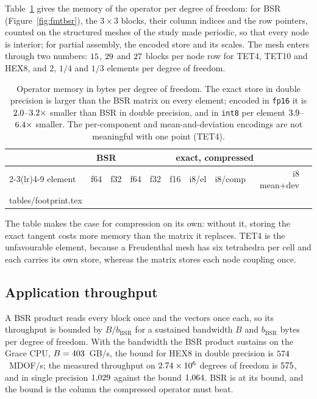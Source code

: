\documentclass[sigconf,balance=false]{acmart}
\makeatletter
\newcommand{\rows}[1]{\@@input #1 }
\makeatother
\begin{document}
Table~\ref{tab:footprint} gives the memory of the operator per degree of freedom: for BSR
(Figure~\ref{fig:fmtbsr}), the
$3\times3$ blocks, their column indices and the row pointers, counted on the structured meshes of
the study made periodic, so that every node is interior; for partial assembly, the encoded store and
its scales.  The mesh enters through two numbers: $15$, $29$ and
$27$ blocks per node row for TET4, TET10 and HEX8, and $2$, $1/4$ and $1/3$ elements
per degree of freedom.

\begin{table}[t]
\centering
\small
\begin{tabular}{lrrrrrrrrr}
\toprule
 & \multicolumn{2}{c}{BSR} & \multicolumn{6}{c}{exact, compressed} \\
\cmidrule(lr){2-3}\cmidrule(lr){4-9}
element & f64 & f32 & f64 & f32 & f16 & i8/el & i8/comp & i8 mean+dev \\
\midrule
\rows{tables/footprint.tex}
\bottomrule
\end{tabular}
\caption{Operator memory in bytes per degree of freedom.  The exact store in double precision is larger than the BSR matrix on every
element; encoded in \texttt{fp16} it is $2.0$--$3.2\times$ smaller than
BSR in double precision, and in \texttt{int8} per element $3.9$--$6.4\times$
smaller.  The per-component and mean-and-deviation encodings are not meaningful with one point
(TET4).}
\label{tab:footprint}
\end{table}

The table makes the case for compression on its own: without it, storing the exact tangent costs
more memory than the matrix it replaces.  TET4 is the unfavourable element, because a Freudenthal
mesh has six tetrahedra per cell and each carries its own store, whereas the matrix stores each
node coupling once.

\subsection{Application throughput}

A BSR product reads every block once and the vectors once each, so its throughput is bounded by
$B/b_{\mathrm{BSR}}$ for a sustained bandwidth $B$ and $b_{\mathrm{BSR}}$ bytes per degree of
freedom.  With the bandwidth the BSR product sustains on the Grace CPU,
$B=403$~GB/s, the bound for HEX8 in double precision is $574$~MDOF/s;
the measured throughput on $2.74\times10^{6}$ degrees of freedom is $575$, and in
single precision $1{,}029$ against the bound $1{,}064$.  BSR is at its bound, and the bound is the column the compressed operator must
beat.
\end{document}
